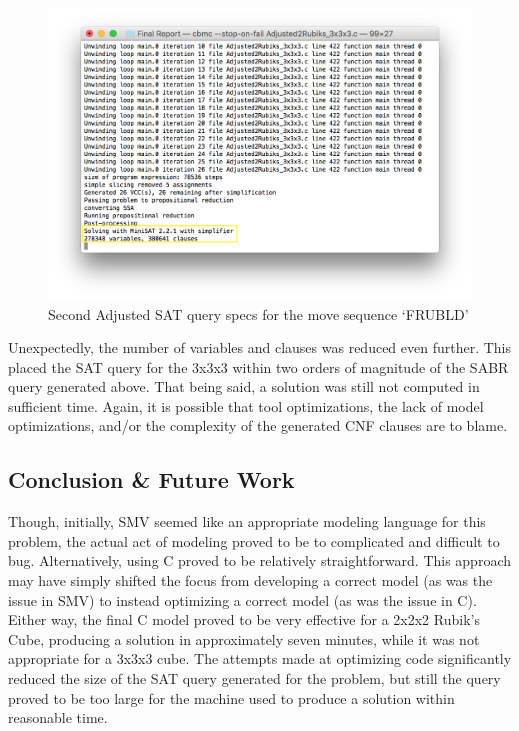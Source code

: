 \documentclass{article}
\begin{document}
\begin{figure}[h]
\includegraphics[width=\textwidth]{pics/3x3x3Adjusted2_SAT_Query_Specs.png}
\caption{Second Adjusted SAT query specs for the move sequence `FRUBLD'}
\end{figure}

\noindent Unexpectedly, the number of variables and clauses was reduced even further. This placed the SAT query for the 3x3x3 within two orders of magnitude of the SABR query generated above. That being said, a solution was still not computed in sufficient time. Again, it is possible that tool optimizations, the lack of model optimizations, and/or the complexity of the generated CNF clauses are to blame.

\subsection {Conclusion \& Future Work}

Though, initially, SMV seemed like an appropriate modeling language for this problem, the actual act of modeling proved to be to complicated and difficult to bug. Alternatively, using C proved to be relatively straightforward. This approach may have simply shifted the focus from developing a correct model (as was the issue in SMV) to instead optimizing a correct model (as was the issue in C). Either way, the final C model proved to be very effective for a 2x2x2 Rubik's Cube, producing a solution in approximately seven minutes, while it was not appropriate for a 3x3x3 cube. The attempts made at optimizing code significantly reduced the size of the SAT query generated for the problem, but still the query proved to be too large for the machine used to produce a solution within reasonable time.\\
\end{document}

